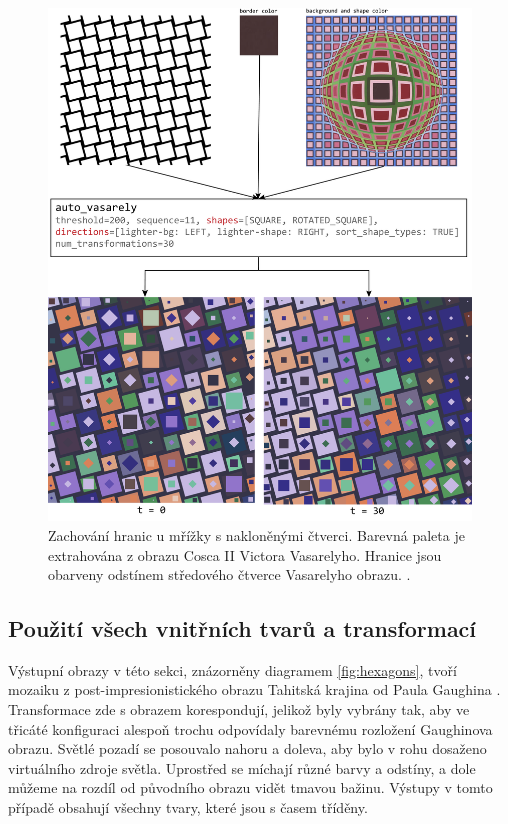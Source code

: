 \begin{figure}[H]
    \centering
    \includegraphics[width=\textwidth]{obrazky-figures/tilted_squares.pdf}
    \caption{Zachování hranic u mřížky s nakloněnými čtverci. Barevná paleta je extrahována z obrazu Cosca II Victora Vasarelyho. Hranice jsou obarveny odstínem středového čtverce Vasarelyho obrazu. \cite{cosca2}. }
    \label{fig:tilted_squares}
\end{figure}

\subsection*{Použití všech vnitřních tvarů a transformací}

Výstupní obrazy v této sekci, znázorněny diagramem \ref{fig:hexagons}, tvoří mozaiku \linebreak z post-impresionistického obrazu Tahitská krajina od Paula Gaughina  \cite{tahiti}. Transformace zde s obrazem korespondují, jelikož byly vybrány tak, aby ve třicáté konfiguraci alespoň trochu odpovídaly barevnému rozložení Gaughinova obrazu. Světlé pozadí se posouvalo nahoru a doleva, aby bylo v rohu dosaženo virtuálního zdroje světla. Uprostřed se míchají různé barvy a odstíny, a dole můžeme na rozdíl od původního obrazu vidět tmavou bažinu. Výstupy v tomto případě obsahují všechny tvary, které jsou s časem tříděny. 

